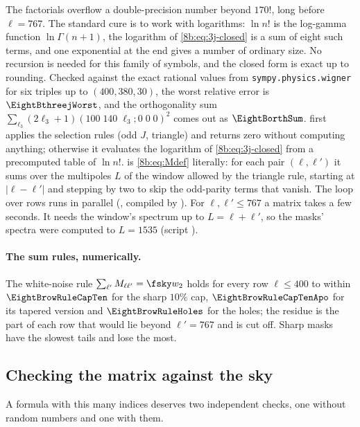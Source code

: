 The factorials overflow a double-precision number beyond $170!$, long before $\ell=767$. The
standard cure is to work with logarithms: $\ln n!$ is the log-gamma function
$\ln\Gamma(n+1)$, the logarithm of \eqref{8b:eq:3j-closed} is a sum of eight such terms, and
one exponential at the end gives a number of ordinary size. No recursion is needed for this
family of symbols, and the closed form is exact up to rounding. Checked against the exact
rational values from \texttt{sympy.physics.wigner} for six triples up to $(400,380,30)$, the worst
relative error is $\EightBthreejWorst$, and the orthogonality sum
$\sum_{\ell_3}(2\ell_3+1)(100\;140\;\ell_3;0\;0\;0)^2$ comes out as $\EightBorthSum$.
\noindent
{} first applies the selection rules (odd $J$, triangle) and returns zero
without computing anything; otherwise it evaluates the logarithm of \eqref{8b:eq:3j-closed}
from a precomputed table  of $\ln n!$.  is \eqref{8b:eq:Mdef}
literally: for each pair $(\ell,\ell')$ it sums over the multipoles $L$ of the window allowed by the
triangle rule, starting at $|\ell-\ell'|$ and stepping by two to skip the odd-parity terms that
vanish. The loop over rows runs in parallel (, compiled by ).
For $\ell,\ell'\le767$ a matrix takes a few seconds. It needs the window's spectrum up to
$L=\ell+\ell'$, so the masks' spectra were computed to $L=1535$
(script ).

\paragraph{The sum rules, numerically.}
The white-noise rule $\sum_{\ell'}M_{\ell\ell'}=\fsky w_2$ holds for every row $\ell\le400$ to within
$\EightBrowRuleCapTen$ for the sharp $10\%$ cap, $\EightBrowRuleCapTenApo$ for its tapered version and
$\EightBrowRuleHoles$ for the holes; the residue is the part of each row that would lie beyond
$\ell'=767$ and is cut off. Sharp masks have the slowest tails and lose the most.

\subsection{Checking the matrix against the sky}
\label{8b:sec:coupling-check}

A formula with this many indices deserves two independent checks, one without random numbers and
one with them.

